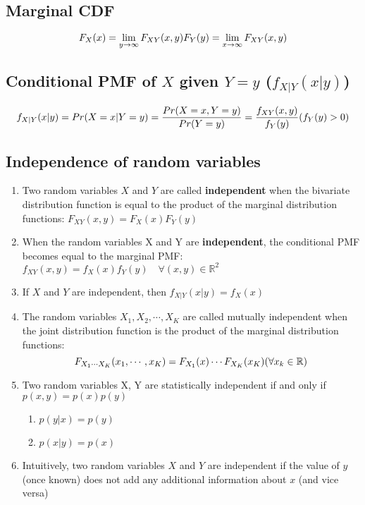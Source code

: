 \subsection{Marginal CDF \cite{ism-1}}\label{Marginal CDF}
\[
    \hfill
    F_X(x) = \lim_{y\to\infty} F_{XY}(x, y)
    \hfill
    F_Y(y) = \lim_{x\to\infty} F_{XY}(x, y)
    \hfill
\]


\subsection{Conditional PMF of $X$ given $Y = y$ ($f_{X|Y}(x|y)$) \cite{ism-1}}\label{conditional PMF}

\[
    f_{X|Y}(x|y) = Pr(X=x|Y=y)
    =\dfrac{Pr(X=x, Y=y)}{Pr(Y=y)} 
    = \dfrac{f_{XY}(x,y)}{f_Y(y)}
    \hfill
    (f_Y(y) > 0)
\]

\subsection{Independence of random variables \cite{ism-1}} \label{Independence of random variables}

\begin{enumerate}
    \item Two random variables $X$ and $Y$ are called \textbf{independent} when the bivariate distribution function is equal to the product of the marginal distribution functions: $F_{XY}(x, y) = F_X(x)F_Y(y)$

    \item When the random variables X and Y are \textbf{independent}, the conditional PMF becomes equal to the marginal PMF: $f_{XY}(x, y) = f_X(x)f_Y(y) \quad\forall (x,y) \in \mathbb{R}^2$

    \item If $X$ and $Y$ are independent, then $f_{X|Y}(x|y) = f_X(x)$

    \item The random variables $X_1, X_2,\cdots, X_K$ are called mutually independent when the joint distribution function is the product of the marginal distribution functions:
    \[
        F_{X_1\cdots X_K}(x_1,\cdots, x_K) = F_{X_1}(x)\cdots F_{X_K}(x_K)
        \hfill
        (\forall x_k \in \mathbb{R})
    \]

    \item Two random variables X, Y are statistically independent if and only if $p(x,y) = p(x)p(y)$ \cite{mfml-1}
    \begin{enumerate}
        \item $ p(y | x) = p(y)$
        \item $ p(x | y) = p(x)$
    \end{enumerate}

    \item Intuitively, two random variables $X$ and $Y$ are independent if the value of $y$ (once known) does not add any additional information about $x$ (and vice versa) \cite{mfml-1}
\end{enumerate}


